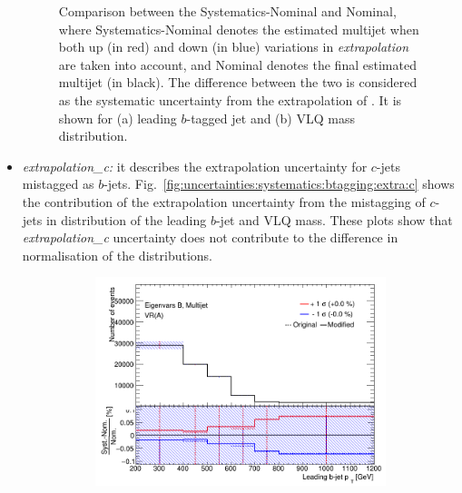 \begin{itemize}
\begin{figure}[hbt!]
\begin{subfigure}{.35\textwidth}
			\caption{}
			\label{fig:uncertainties:systematics:btagging:extra:vlqm}
		\end{subfigure}
		\caption{Comparison between the Systematics-Nominal and Nominal, where Systematics-Nominal denotes the estimated multijet when both up (in red) and down (in blue) variations in \textit{extrapolation} are taken into account, and Nominal denotes the final estimated multijet (in black). The difference between the two is considered as the systematic uncertainty from the extrapolation of \pt. It is shown for (a) leading $b$-tagged jet \pt and (b) VLQ mass distribution.}
		\label{fig:uncertainties:systematics:btagging:extra}
	\end{figure}

	\item \textit{extrapolation\_c:} it describes the extrapolation uncertainty for $c$-jets mistagged as $b$-jets. Fig.\ \ref{fig:uncertainties:systematics:btagging:extra:c} shows the contribution of the extrapolation uncertainty from the mistagging of $c$-jets in \pt distribution of the leading $b$-jet and VLQ mass. These plots show that \textit{extrapolation\_c} uncertainty does not contribute to the difference in normalisation of the distributions.
	\begin{figure}[hbt!]
		\centering
		\graphicspath{{figs/chapter6/Systematics/Extrapolationfromcharm/}}
		\begin{subfigure}{.35\textwidth}
			\centering
			\includegraphics[width=\linewidth,height=\textheight,keepaspectratio]{VR_B_jet_pt_Multijets.png}
			\caption{}
			\label{fig:uncertainties:systematics:btagging:extra:c:jetpt}
		\end{subfigure}\hspace{0.6cm}

\end{figure}
\end{itemize}
